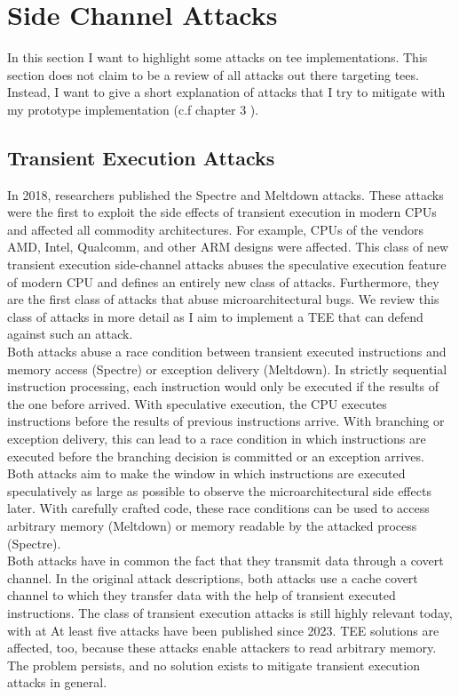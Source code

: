 \section{Side Channel Attacks}
\label{sec:20:attacks}
In this section I want to highlight some attacks on \gls{tee} implementations.
This section does not claim to be a review of all attacks out there targeting
\glspl{tee}. Instead, I want to give a short explanation of attacks that I try
to mitigate with my prototype implementation (c.f chapter 3 ).

\subsection{Transient Execution Attacks}
\label{sec:20:transientattacks}
In 2018, researchers published the Spectre and Meltdown
attacks.\cite{kocher_spectre_2020, lipp_meltdown_2020} These attacks were the
first to exploit the side effects of transient execution in modern CPUs and
affected all commodity architectures. For example, CPUs of the vendors AMD,
Intel, Qualcomm, and other ARM designs were affected. This class of new
transient execution side-channel attacks abuses the speculative execution
feature of modern CPU and defines an entirely new class of attacks. Furthermore,
they are the first class of attacks that abuse microarchitectural bugs. We
review this class of attacks in more detail as I aim to implement a TEE that can
defend against such an attack.\\

Both attacks abuse a race condition between transient executed instructions and
memory access (Spectre) or exception delivery (Meltdown). In strictly sequential
instruction processing, each instruction would only be executed if the results
of the one before arrived. With speculative execution, the CPU executes
instructions before the results of previous instructions arrive. With branching
or exception delivery, this can lead to a race condition in which instructions
are executed before the branching decision is committed or an exception arrives.
Both attacks aim to make the window in which instructions are executed
speculatively as large as possible to observe the microarchitectural side
effects later. With carefully crafted code, these race conditions can be used to
access arbitrary memory (Meltdown) or memory readable by the attacked process
(Spectre). \\

Both attacks have in common the fact that they transmit data through a covert
channel. In the original attack descriptions, both attacks use a cache covert
channel to which they transfer data with the help of transient executed
instructions. The class of transient execution attacks is still highly relevant
today, with at At least five attacks have been published since 2023.
\cite{ormandy2023zenbleed,trujillo2023inception, moghimi2023downfall,ragab_ghostrace_2024, wilke2024tdxdown}
TEE solutions are affected, too, because these attacks enable attackers to read
arbitrary memory. The problem persists, and no solution exists to mitigate
transient execution attacks in general.\\

